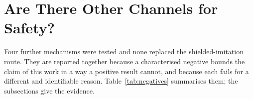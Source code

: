 %
%
%

\section{Are There Other Channels for Safety?}\label{sec:res:channels}

Four further mechanisms were tested and none replaced the shielded-imitation route. They are
reported together because a characterised negative bounds the claim of this work in a way a
positive result cannot, and because each fails for a different and identifiable reason.
Table~\ref{tab:negatives} summarises them; the subsections give the evidence.

